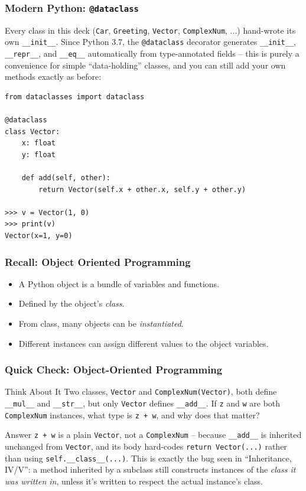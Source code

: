 \begin{frame}[fragile]\frametitle{Modern Python: \texttt{@dataclass}}
Every class in this deck (\texttt{Car}, \texttt{Greeting}, \texttt{Vector}, \texttt{ComplexNum}, ...)
hand-wrote its own \texttt{\_\_init\_\_}. Since Python 3.7, the \texttt{@dataclass} decorator
generates \texttt{\_\_init\_\_}, \texttt{\_\_repr\_\_}, and \texttt{\_\_eq\_\_} automatically from
type-annotated fields -- this is purely a convenience for simple ``data-holding'' classes, and you
can still add your own methods exactly as before:
\begin{lstlisting}
from dataclasses import dataclass

@dataclass
class Vector:
    x: float
    y: float

    def add(self, other):
        return Vector(self.x + other.x, self.y + other.y)

>>> v = Vector(1, 0)
>>> print(v)
Vector(x=1, y=0)
\end{lstlisting}
\end{frame}

\begin{frame}[fragile]\frametitle{Recall: Object Oriented Programming}

\begin{itemize}
\item A Python object is a bundle of variables and functions.
\item Defined  by the object's \emph{class}.
\item  From class, many objects can be \emph{instantiated}.
\item Different instances can assign different values to the object variables.
\end{itemize}
\end{frame}

\begin{frame}[fragile]\frametitle{Quick Check: Object-Oriented Programming}
\begin{block}{Think About It}
Two classes, \texttt{Vector} and \texttt{ComplexNum(Vector)}, both define \texttt{\_\_mul\_\_}
and \texttt{\_\_str\_\_}, but only \texttt{Vector} defines \texttt{\_\_add\_\_}. If \texttt{z}
and \texttt{w} are both \texttt{ComplexNum} instances, what type is \texttt{z + w}, and why does
that matter?
\end{block}
\pause
\begin{block}{Answer}
\texttt{z + w} is a plain \texttt{Vector}, not a \texttt{ComplexNum} -- because
\texttt{\_\_add\_\_} is inherited unchanged from \texttt{Vector}, and its body hard-codes
\texttt{return Vector(...)} rather than using \texttt{self.\_\_class\_\_(...)}. This is exactly
the bug seen in ``Inheritance, IV/V'': a method inherited by a subclass still constructs
instances of the \emph{class it was written in}, unless it's written to respect the actual
instance's class.
\end{block}
\end{frame}
